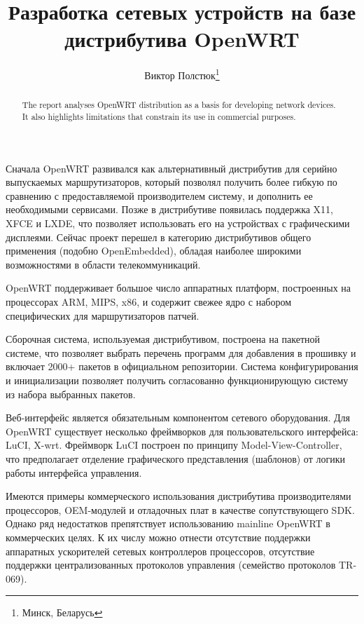 \documentclass[10pt, a5paper]{article}
\begin{document}
\title{Разработка сетевых устройств на базе дистрибутива OpenWRT}%

\author{Виктор Полстюк\footnote{Минск, Беларусь}}
\maketitle

\begin{abstract}
The report analyses OpenWRT distribution as a basis for developing network devices. It also highlights limitations that constrain its use in commercial purposes.
\end{abstract}


Сначала OpenWRT развивался как альтернативный дистрибутив для серийно выпускаемых маршрутизаторов, который позволял получить более гибкую по сравнению с предоставляемой производителем систему, и дополнить ее необходимыми сервисами. Позже в дистрибутиве появилась поддержка X11, XFCE и LXDE, что позволяет использовать его на устройствах с графическими дисплеями. Сейчас проект перешел в категорию дистрибутивов общего применения (подобно OpenEmbedded), обладая наиболее широкими возможностями в области телекоммуникаций.

OpenWRT поддерживает большое число аппаратных платформ, построенных на процессорах ARM, MIPS, x86, и содержит свежее ядро с набором специфических для маршрутизаторов патчей. 

Сборочная система, используемая дистрибутивом, построена на пакетной системе, что позволяет выбрать перечень программ для добавления в прошивку и включает 2000+ пакетов в официальном репозитории. Система конфигурирования и инициализации позволяет получить согласованно функционирующую систему из набора выбранных пакетов.

Веб-интерфейс является обязательным компонентом сетевого оборудования.  Для OpenWRT существует несколько фреймворков для пользовательского интерфейса: LuCI, X-wrt. Фреймворк LuCI построен по принципу Model-View-Controller, что предполагает отделение графического представления (шаблонов) от логики работы интерфейса управления.

Имеются примеры коммерческого использования дистрибутива производителями процессоров, OEM-модулей и отладочных плат в качестве сопутствующего SDK. Однако ряд недостатков препятствует использованию mainline OpenWRT в коммерческих целях. К их числу можно отнести отсутствие поддержки аппаратных ускорителей сетевых контроллеров процессоров, отсутствие поддержки централизованных протоколов управления (семейство протоколов TR-069).
\end{document}
